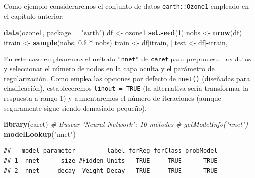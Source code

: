 \documentclass[
  spanish,
]{book}
\newenvironment{Shaded}{\begin{snugshade}}{\end{snugshade}}
\newcommand{\CommentTok}[1]{\textcolor[rgb]{0.56,0.35,0.01}{\textit{#1}}}
\newcommand{\DataTypeTok}[1]{\textcolor[rgb]{0.13,0.29,0.53}{#1}}
\newcommand{\DecValTok}[1]{\textcolor[rgb]{0.00,0.00,0.81}{#1}}
\newcommand{\FloatTok}[1]{\textcolor[rgb]{0.00,0.00,0.81}{#1}}
\newcommand{\KeywordTok}[1]{\textcolor[rgb]{0.13,0.29,0.53}{\textbf{#1}}}
\newcommand{\NormalTok}[1]{#1}
\newcommand{\OperatorTok}[1]{\textcolor[rgb]{0.81,0.36,0.00}{\textbf{#1}}}
\newcommand{\StringTok}[1]{\textcolor[rgb]{0.31,0.60,0.02}{#1}}
\theoremstyle{break}
\theoremstyle{definition}
\theoremstyle{definition}
\theoremstyle{definition}
\theoremstyle{remark}
\begin{document}
Como ejemplo consideraremos el conjunto de datos \texttt{earth::Ozone1} empleado en el capítulo anterior:

\begin{Shaded}
\begin{Highlighting}[]
\KeywordTok{data}\NormalTok{(ozone1, }\DataTypeTok{package =} \StringTok{"earth"}\NormalTok{)}
\NormalTok{df <-}\StringTok{ }\NormalTok{ozone1}
\KeywordTok{set.seed}\NormalTok{(}\DecValTok{1}\NormalTok{)}
\NormalTok{nobs <-}\StringTok{ }\KeywordTok{nrow}\NormalTok{(df)}
\NormalTok{itrain <-}\StringTok{ }\KeywordTok{sample}\NormalTok{(nobs, }\FloatTok{0.8} \OperatorTok{*}\StringTok{ }\NormalTok{nobs)}
\NormalTok{train <-}\StringTok{ }\NormalTok{df[itrain, ]}
\NormalTok{test <-}\StringTok{ }\NormalTok{df[}\OperatorTok{-}\NormalTok{itrain, ]}
\end{Highlighting}
\end{Shaded}

En este caso emplearemos el método \texttt{"nnet"} de \texttt{caret} para preprocesar los datos y seleccionar el número de nodos en la capa oculta y el parámetro de regularización.
Como emplea las opciones por defecto de \texttt{nnet()} (diseñadas para clasificación),
estableceremos \texttt{linout\ =\ TRUE} (la alternativa sería transformar la respuesta a rango 1) y aumentaremos el número de iteraciones (aunque seguramente sigue siendo demasiado pequeño).

\begin{Shaded}
\begin{Highlighting}[]
\KeywordTok{library}\NormalTok{(caret)}
\CommentTok{# Buscar "Neural Network": 10 métodos}
\CommentTok{# getModelInfo("nnet")}
\KeywordTok{modelLookup}\NormalTok{(}\StringTok{"nnet"}\NormalTok{)}
\end{Highlighting}
\end{Shaded}

\begin{verbatim}
##   model parameter         label forReg forClass probModel
## 1  nnet      size #Hidden Units   TRUE     TRUE      TRUE
## 2  nnet     decay  Weight Decay   TRUE     TRUE      TRUE
\end{verbatim}
\end{document}
